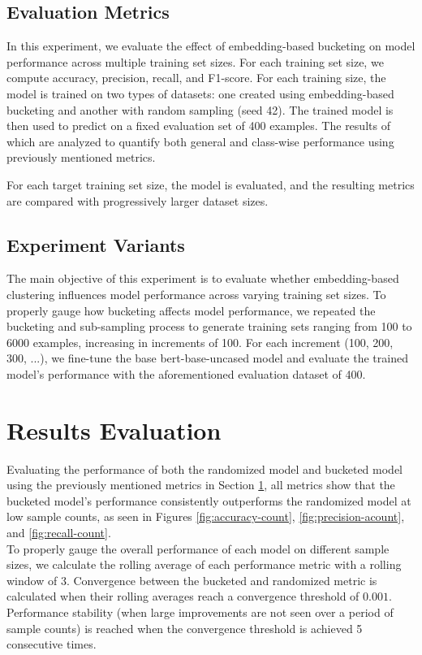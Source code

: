 \documentclass[twocolumn]{article}
\newcounter{ex}
\renewcommand{\indent}{\hspace*{2em}}
\begin{document}
\subsection{Evaluation Metrics}\label{experiments:evaluation}
\indent In this experiment, we evaluate the effect of embedding-based bucketing on model performance across multiple training set sizes. For each training set size, we compute accuracy, precision, recall, and F1-score. For each training size, the model is trained on two types of datasets: one created using embedding-based bucketing and another with random sampling (seed 42). The trained model is then used to predict on a fixed evaluation set of 400 examples. The results of which are analyzed to quantify both general and class-wise performance using previously mentioned metrics.

For each target training set size, the model is evaluated, and the resulting metrics are compared with progressively larger dataset sizes.

\subsection{Experiment Variants}\label{experiments:variants}
\indent The main objective of this experiment is to evaluate whether embedding-based clustering influences model performance across varying training set sizes. To properly gauge how bucketing affects model performance, we repeated the bucketing and sub-sampling process to generate training sets ranging from 100 to 6000 examples, increasing in increments of 100. For each increment (100, 200, 300, ...), we fine-tune the base bert-base-uncased model and evaluate the trained model's performance with the aforementioned evaluation dataset of 400. 

\section{Results Evaluation}\label{evaluation}
\indent Evaluating the performance of both the randomized model and bucketed model using the previously mentioned metrics in Section \ref{evaluation}, all metrics show that the bucketed model's performance consistently outperforms the randomized model at low sample counts, as seen in Figures \ref{fig:accuracy-count}, \ref{fig:precision-acount}, and \ref{fig:recall-count}. \\

\indent To properly gauge the overall performance of each model on different sample sizes, we calculate the rolling average of each performance metric with a rolling window of 3. Convergence between the bucketed and randomized metric is calculated when their rolling averages reach a convergence threshold of $0.001$. Performance stability (when large improvements are not seen over a period of sample counts) is reached when the convergence threshold is achieved 5 consecutive times.\\
\end{document}
